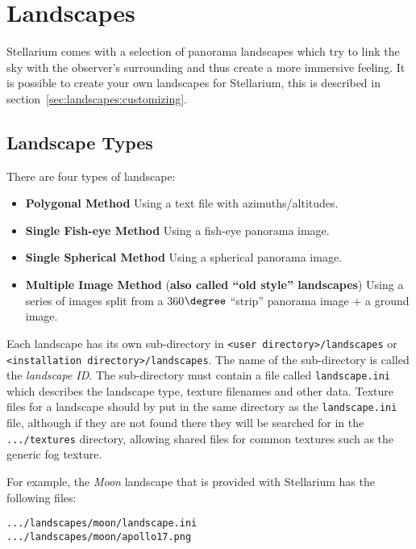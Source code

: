 
\chapter{Landscapes}\label{customising-landscapes}
\label{ch:landscapes}

Stellarium comes with a selection of panorama landscapes which try to
link the sky with the observer's surrounding and thus create a more
immersive feeling.  It is possible to create your own landscapes for
Stellarium, this is described in
section~\ref{sec:landscapes:customizing}. 

\section{Landscape Types}
\label{sec:landscapes:types}


There are four types of landscape:

\begin{itemize}
\item
  \textbf{Polygonal Method} Using a text file with azimuths/altitudes.
\item
  \textbf{Single Fish-eye Method} Using a fish-eye panorama image.
\item
  \textbf{Single Spherical Method} Using a spherical panorama image.
\item
  \textbf{Multiple Image Method} (\textbf{also called ``old style''
  landscapes}) Using a series of images split from a 360$\degree$ ``strip''
  panorama image + a ground image.
\end{itemize}

Each landscape has its own sub-directory in
\texttt{\textless{}user\ directory\textgreater{}/landscapes} or
\texttt{\textless{}installation\ directory\textgreater{}/landscapes}.
The name of the sub-directory is called the \emph{landscape ID}. The
sub-directory must contain a file called \texttt{landscape.ini} which
describes the landscape type, texture filenames and other data. Texture
files for a landscape should by put in the same directory as the
\texttt{landscape.ini} file, although if they are not found there they
will be searched for in the \texttt{.../textures} directory, allowing
shared files for common textures such as the generic fog texture.

For example, the \emph{Moon} landscape that is provided with Stellarium
has the following files:

\texttt{.../landscapes/moon/landscape.ini}\\
\texttt{.../landscapes/moon/apollo17.png}

